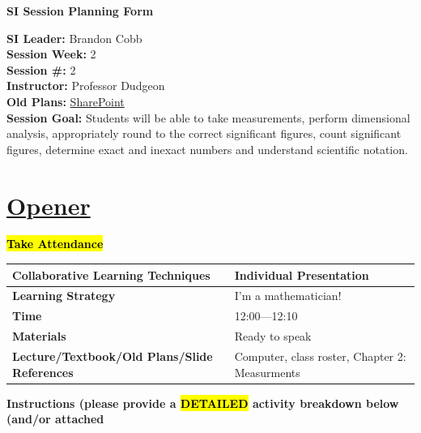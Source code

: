 \documentclass{article}
\begin{document}
\usetikzlibrary{positioning, shapes.geometric, arrows.meta, decorations.pathreplacing, fit, backgrounds}
\begin{center}
    {\LARGE \textbf{SI Session Planning Form}}
\end{center}

\vspace{0.5cm}

\noindent
\begin{flushleft}
\textbf{SI Leader:} Brandon Cobb \\
\textbf{Session Week:} 2 \\
\textbf{Session \#:} 2 \\
\textbf{Instructor:} Professor Dudgeon \\
\textbf{Old Plans:} \href{https://macombedu.sharepoint.com/:b:/s/ASC-SupplementalInstructionEmbeddedTutoring/IQBvRyfNvxGGQYObfgZOKn8UARbteAbUZFaLhS7nR4OoDmQ?e=Ic6HHf}{SharePoint} \\
\textbf{Session Goal:} Students will be able to take measurements, perform dimensional analysis, appropriately round to the correct significant figures, count significant figures, determine exact and inexact numbers and understand scientific notation.
\end{flushleft}

\vspace{1em}
\section*{\underline{Opener}}
{\centering\large\textbf{\hl{Take Attendance}}\par}\vspace{-0.25\baselineskip}


\begin{tabular}{|p{4.2cm}|p{9.8cm}|}
\hline
\textbf{Collaborative Learning Techniques} & Individual Presentation \\
\hline
\textbf{Learning Strategy} & I'm a mathematician! \\
\hline
\textbf{Time} & 12:00---12:10 \\
\hline
\textbf{Materials} & Ready to speak \\
\hline
\textbf{Lecture/Textbook/Old Plans/Slide References} & Computer, class roster, Chapter 2: Measurments \\
\hline
\end{tabular}

\vspace{0.5cm}
\noindent
{\large \textbf{Instructions (please provide a \hl{DETAILED} activity breakdown below (and/or attached}} \\
\newpage
\end{document}
